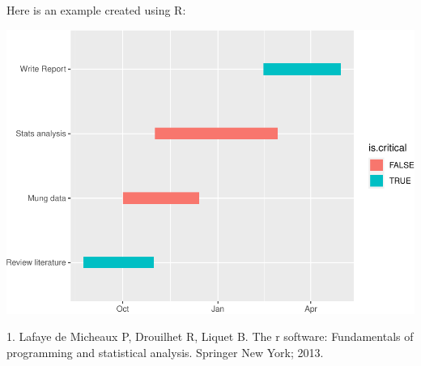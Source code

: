 \documentclass[mstat,12pt]{unswthesis}
\newenvironment{CSLReferences}%
  {}%
  {\par}
\begin{document}
\bigskip

Here is an example created using R:

\includegraphics{unsw-ZZSC9020-Project-Plan-template_files/figure-latex/unnamed-chunk-1-1.pdf}





\hypertarget{refs}{}
\begin{CSLReferences}{0}{0}
\leavevmode{}%
1. Lafaye de Micheaux P, Drouilhet R, Liquet B. The r software:
Fundamentals of programming and statistical analysis. Springer New York;
2013.

\end{CSLReferences}
\end{document}
